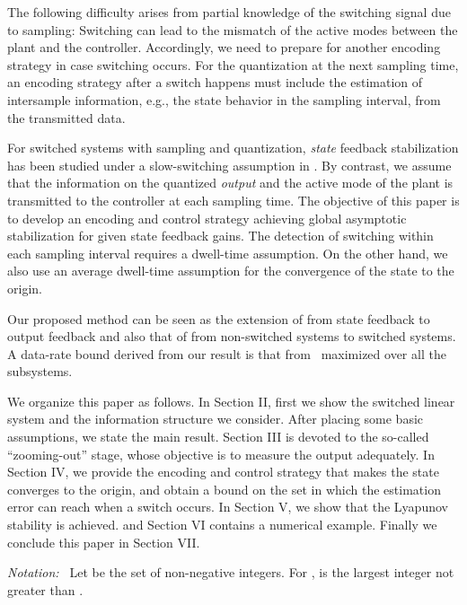 \documentclass[letterpaper, 11pt, onecolumn]{ieeeconf}  \IEEEoverridecommandlockouts
\begin{document}
The following difficulty arises from partial knowledge of the switching signal
due to sampling:
Switching can lead to the mismatch of the active modes between
the plant and the controller.
Accordingly, 
we need to prepare for another encoding strategy in case switching occurs.
For the quantization at the next sampling time, an encoding strategy
after a switch happens
must include the estimation of intersample information, e.g., the state behavior
in the sampling interval, from the transmitted data.

For switched systems with sampling and quantization, 
{\em state} feedback stabilization
has been studied under a slow-switching assumption
in \cite{Liberzon2014,Wakaiki2014IFAC}.
By contrast,
we assume that the information on 
the quantized {\em output} and the active mode of the plant
is transmitted to the controller at each sampling time.
The objective of this paper is to
develop an encoding and control strategy
achieving global asymptotic stabilization for given state feedback gains. 
The detection of switching within each sampling interval requires
a dwell-time assumption. On the other hand, we also use an average dwell-time
assumption for the convergence of the state to the origin.

Our proposed method can be seen as the extension of
\cite{Liberzon2014} from state feedback to output feedback
and also
that of \cite{Liberzon2003} from non-switched systems to switched systems.
A data-rate bound derived from our result is that from~\cite{Liberzon2003}
maximized over all the subsystems.



We organize this paper as follows. In Section II, first we show the switched 
linear system and the information structure we consider. After placing 
some basic assumptions, we state the main result.
Section III is devoted to the so-called ``zooming-out'' stage, whose objective
is to measure the output adequately.
In Section IV, we provide the encoding and control strategy 
that makes the state converges to the origin, and 
obtain a bound on the set in which the estimation error can reach when
a switch occurs.
In Section V, we show that the Lyapunov stability is achieved.
and Section VI contains a numerical example. 
Finally we conclude this paper in Section VII.








{\it Notation:~}
Let  be the set of non-negative integers.
For ,  is the largest integer not 
greater than .
\end{document}
